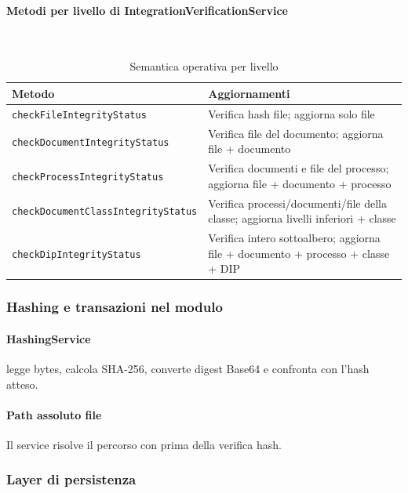 \paragraph{Metodi per livello di IntegrationVerificationService}\
\begin{table}[H]
	\centering
	\footnotesize
	\setlength{\tabcolsep}{4pt}
	\renewcommand{\arraystretch}{1.4}
	\begin{tabularx}{\textwidth}{|l|Y|}
		\hline
		\textbf{Metodo} & \textbf{Aggiornamenti} \\
		\hline
		\texttt{checkFileIntegrityStatus} & Verifica hash file; aggiorna solo file \\
		\hline
		\texttt{checkDocumentIntegrityStatus} & Verifica file del documento; aggiorna file + documento \\
		\hline
		\texttt{checkProcessIntegrityStatus} & Verifica documenti e file del processo; aggiorna file + documento + processo \\
		\hline
		\texttt{checkDocumentClassIntegrityStatus} & Verifica processi/documenti/file della classe; aggiorna livelli inferiori + classe \\
		\hline
		\texttt{checkDipIntegrityStatus} & Verifica intero sottoalbero; aggiorna file + documento + processo + classe + DIP \\
		\hline
	\end{tabularx}
	\caption{Semantica operativa per livello}
	\label{tab:integrity:semantics}
\end{table}

\subsubsection{Hashing e transazioni nel modulo}
\label{sec:integrity:infra}

\paragraph{HashingService}
\noindent
{} legge bytes, calcola SHA-256, converte digest Base64 e confronta con l'hash atteso.

\paragraph{Path assoluto file}
\noindent
Il service risolve il percorso con  prima della verifica hash.

\subsubsection{Layer di persistenza}
\label{sec:integrity:repository_dao}

